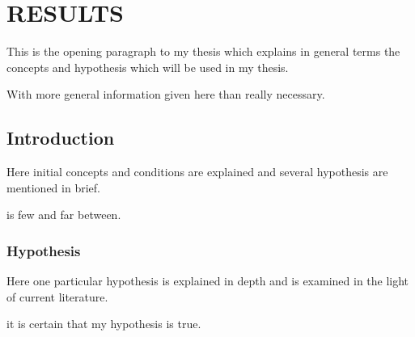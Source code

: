 \chapter{RESULTS}

This is the opening paragraph to my thesis which
explains in general terms the concepts and hypothesis
which will be used in my thesis.

With more general information given here than really
necessary.

\section{Introduction}

Here initial concepts and conditions are explained and
several hypothesis are mentioned in brief.

is few and far between.



\subsection{Hypothesis}

Here one particular hypothesis is explained in depth
and is examined in the light of current literature.

it is certain that my hypothesis is true.




